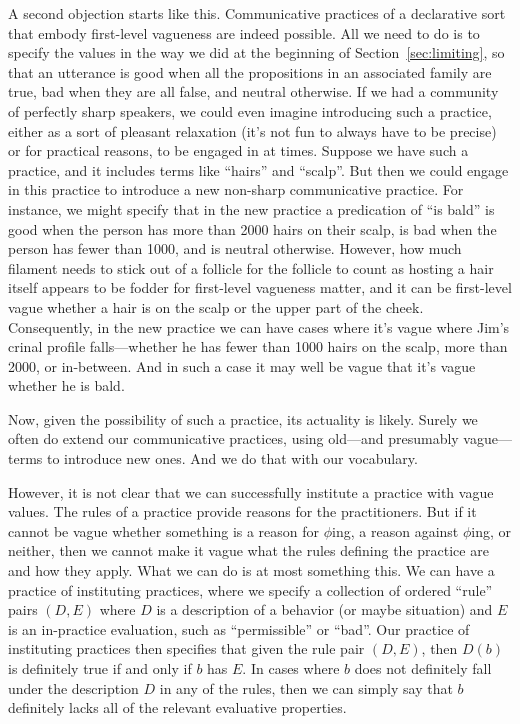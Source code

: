 A second objection starts like this. Communicative practices of a declarative sort that embody first-level vagueness are indeed possible. All we 
need to do is to specify the values in the way we did at the beginning of Section~\ref{sec:limiting}, so that an utterance is 
good when all the propositions in an associated family are true, bad when they are all false, and neutral otherwise. If we had
a community of perfectly sharp speakers, we could even imagine introducing such a practice, either as a sort of pleasant relaxation
(it's not fun to always have to be precise) or for practical reasons, to be engaged in at times. Suppose we have such a practice, and it
includes terms like ``hairs'' and ``scalp''. But then we could engage in this practice to introduce a new non-sharp
communicative practice. For instance, we might specify that in the new practice a predication of ``is bald'' is good when 
the person has more than 2000 hairs on their scalp, is bad when the person has fewer than 1000, and is neutral otherwise. However, 
how much filament  needs to stick out of a follicle for the follicle to count as hosting a hair itself appears to be fodder for 
first-level vagueness matter, and it can be first-level vague whether a hair is on the scalp or the upper part of the cheek.
Consequently, in the new practice we can have cases where it's vague where Jim's crinal profile falls---whether he has fewer than 
1000 hairs on the scalp, more than 2000, or in-between. And in such a case it may well be vague that it's vague whether he is bald.

Now, given the possibility of such a practice, its actuality is likely. Surely we often do extend our communicative practices,
using old---and presumably vague---terms to introduce new ones. And we do that with our vocabulary.

However, it is not clear that we can successfully institute a practice with vague values. The rules of a practice 
provide reasons for the practitioners. But if
it cannot be vague whether something is a reason for $\phi$ing, a reason against $\phi$ing, or neither, then we cannot make it
vague what the rules defining the practice are and how they apply. What we can do is at most something this. We can have a practice 
of instituting practices, where we specify a collection of ordered ``rule'' pairs $(D,E)$ where $D$ is a description of a behavior (or maybe situation) and $E$ is an in-practice evaluation, such as ``permissible'' 
or ``bad''. Our practice of instituting practices then specifies that given the rule pair $(D,E)$, then $D(b)$ is 
definitely true if and only if $b$ has $E$.
In cases where $b$ does not definitely fall under the description $D$ in any of the rules, then we can simply say that $b$ definitely
lacks all of the relevant evaluative properties. 

